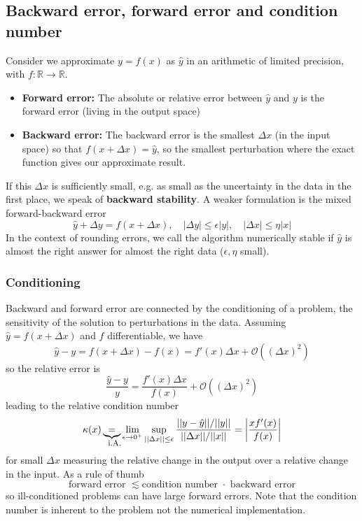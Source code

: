 \subsection{Backward error, forward error and condition number}
Consider we approximate $y=f(x)$ as $\hat{y}$ in an arithmetic of limited precision, with $f: \mathbb{R} \rightarrow \mathbb{R}$.
\begin{itemize}
    \item \textbf{Forward error:} The absolute or relative error between $\hat{y}$ and $y$ is the forward error (living in the output space)
    \item \textbf{Backward error:} The backward error is the smallest $\Delta x$ (in the input space) so that $f(x+\Delta x) = \hat{y}$, so the smallest perturbation where the exact function gives our approximate result.
\end{itemize}
If this $\Delta x$ is sufficiently small, e.g. as small as the uncertainty in the data in the first place, we speak
of \textbf{backward stability}. A weaker formulation is the mixed forward-backward error
\begin{equation}
    \hat{y} + \Delta y = f(x + \Delta x), \quad |\Delta y| \leq \epsilon |y|, \quad |\Delta x| \leq \eta |x|
\end{equation}
In the context of rounding errors, we call the algorithm numerically stable if $\hat{y}$ is almost the right answer for
almost the right data ($\epsilon,\eta$ small).
\subsubsection{Conditioning}
Backward and forward error are connected by the conditioning of a problem, the sensitivity of the
solution to perturbations in the data. Assuming $\hat{y} = f(x + \Delta x)$ and $f$ differentiable, we have
\begin{equation}
    \hat{y} - y = f(x + \Delta x) - f(x) = f'(x) \Delta x + \mathcal{O}((\Delta x)^2)
\end{equation}
so the relative error is
\begin{equation}
    \frac{\hat{y} - y}{y} = \frac{f'(x) \Delta x}{f(x)} + \mathcal{O}((\Delta x)^2)
\end{equation}
leading to the relative condition number
\begin{equation}
    \kappa(x) \explain{=}{i.A.} \lim_{\epsilon \rightarrow 0^+} \sup_{||\Delta x|| \leq \epsilon} \frac{||y-\hat{y}|| / ||y||}{||\Delta x|| / ||x||} = \left| \frac{x f'(x)}{f(x)} \right|
\end{equation}
for small $\Delta x$ measuring the relative change in the output over a relative change in the input.
As a rule of thumb
\begin{equation}
    \text{forward error } \lesssim \text{condition number } \cdot \text{ backward error}
\end{equation}
so ill-conditioned problems can have large forward errors. Note that the condition number is inherent to the problem
not the numerical implementation.

